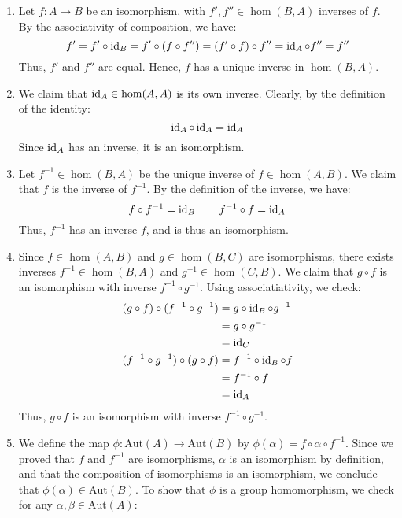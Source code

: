 \documentclass[12pt]{article}
\begin{document}
\begin{solution}
    \bbni
    \begin{enumerate}
        \item Let $f: A \to B$ be an isomorphism, with $f', f'' \in \hom(B, A)$ inverses of $f$. By the associativity of composition, we have: 
        \[ f' = f' \circ \operatorname{id}_B = f' \circ (f \circ f'') = (f' \circ f) \circ f'' = \operatorname{id}_A \circ f'' = f'' \]
        Thus, $f'$ and $f''$ are equal. Hence, $f$ has a unique inverse in $\hom(B,A)$.
        \item We claim that $\operatorname{id}_A \in \hom(A, A)$ is its own inverse. Clearly, by the definition of the identity: 
        \[  \operatorname{id}_A \circ \operatorname{id}_A = \operatorname{id}_A \]
        Since $\operatorname{id}_A$ has an inverse, it is an isomorphism.
        \item Let $f^{-1} \in \hom(B, A)$ be the unique inverse of $f \in \hom(A, B)$. We claim that $f$ is the inverse of $f^{-1}$. By the definition of the inverse, we have:
        \[ f \circ f^{-1} = \operatorname{id}_B \qquad f^{-1} \circ f = \operatorname{id}_A \]
        Thus, $f^{-1}$ has an inverse $f$, and is thus an isomorphism.
        \item Since $f \in \hom(A, B)$ and $g \in \hom(B, C)$ are isomorphisms, there exists inverses $f^{-1} \in \hom(B, A)$ and $g^{-1} \in \hom(C, B)$. We claim that $g \circ f$ is an isomorphism with inverse $f^{-1} \circ g^{-1}$. Using associatiativity, we check: 
        \begin{align*}
            (g \circ f) \circ (f^{-1} \circ g^{-1}) &= g \circ \operatorname{id}_B \circ g^{-1} \\
            &= g \circ g^{-1} \\
            &= \operatorname{id}_C \\
            (f^{-1} \circ g^{-1}) \circ (g \circ f) &= f^{-1} \circ \operatorname{id}_B \circ f \\
            &= f^{-1} \circ f \\
            &= \operatorname{id}_A
        \end{align*}
        Thus, $g \circ f$ is an isomorphism with inverse $f^{-1} \circ g^{-1}$.
        \item We define the map $\phi: \text{Aut}(A) \to \text{Aut}(B)$ by $\phi(\alpha) = f \circ \alpha \circ f^{-1}$. Since we proved that $f$ and $f^{-1}$ are isomorphisms, $\alpha$ is an isomorphism by definition, and that the composition of isomorphisms is an isomorphism, we conclude that $\phi(\alpha) \in \text{Aut}(B)$. To show that $\phi$ is a group homomorphism, we check for any $\alpha, \beta \in \text{Aut}(A)$:
        \begin{align*}

\end{align*}
\end{enumerate}
\end{solution}
\end{document}
